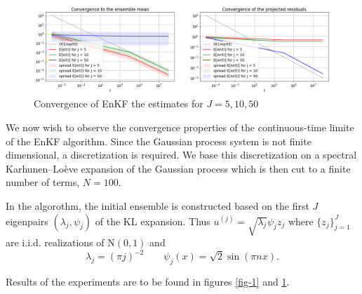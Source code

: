 \documentclass[10pt,a4paper]{article}
\begin{document}
\begin{figure} \label{fig-2}
    \centering
    \includegraphics[scale=0.30]{convergence_plot.png}
    \caption{Convergence of EnKF the estimates for $J = 5, 10, 50$}
\end{figure}

We now wish to observe the convergence properties of the continuous-time limite of the EnKF algorithm. Since
the Gaussian process system is not finite dimensional, a discretization is required. We base
this discretization on a spectral Karhunen–Loève expansion of the Gaussian process which is 
then cut to a finite number of terms, $N = 100$.

In the algorothm, the initial ensemble is constructed based on the 
first $J$ eigenpairs $(\lambda_j, \psi_j)$ of the KL expansion. Thus
$u^{(j)} = \sqrt{\lambda_j}\psi_j z_j$ where $\{z_j\}_{j=1} ^J$ are i.i.d.
realizations of $\text{N}(0, 1)$ and
\begin{equation*}
    \lambda_j = (\pi j)^{-2} \qquad \psi_j(x) = \sqrt{2}\sin(\pi n x).
\end{equation*}

Results of the experiments are to be found in figures \ref{fig-1} and \ref{fig-2}.



\end{document}
